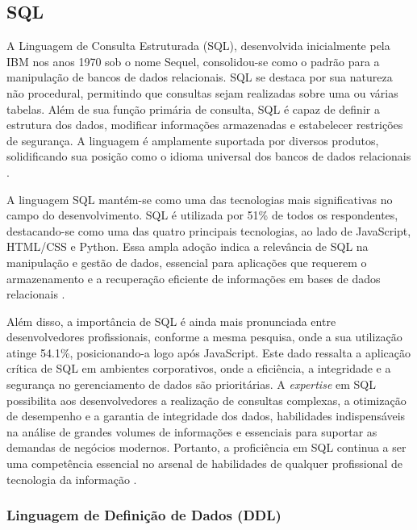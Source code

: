 \subsection{SQL}

A Linguagem de Consulta Estruturada (SQL), desenvolvida inicialmente pela IBM nos anos 1970 sob o nome Sequel, consolidou-se como o padrão para a manipulação de bancos de dados relacionais. SQL se destaca por sua natureza não procedural, permitindo que consultas sejam realizadas sobre uma ou várias tabelas. Além de sua função primária de consulta, SQL é capaz de definir a estrutura dos dados, modificar informações armazenadas e estabelecer restrições de segurança. A linguagem é amplamente suportada por diversos produtos, solidificando sua posição como o idioma universal dos bancos de dados relacionais \cite{silberschatz2011database}.

A linguagem SQL mantém-se como uma das tecnologias mais significativas no campo do desenvolvimento. SQL é utilizada por 51\% de todos os respondentes, destacando-se como uma das quatro principais tecnologias, ao lado de JavaScript, HTML/CSS e Python. Essa ampla adoção indica a relevância de SQL na manipulação e gestão de dados, essencial para aplicações que requerem o armazenamento e a recuperação eficiente de informações em bases de dados relacionais \cite{StackOverflow2024}.

Além disso, a importância de SQL é ainda mais pronunciada entre desenvolvedores profissionais, conforme a mesma pesquisa, onde a sua utilização atinge 54.1\%, posicionando-a logo após JavaScript. Este dado ressalta a aplicação crítica de SQL em ambientes corporativos, onde a eficiência, a integridade e a segurança no gerenciamento de dados são prioritárias. A \textit{expertise} em SQL possibilita aos desenvolvedores a realização de consultas complexas, a otimização de desempenho e a garantia de integridade dos dados, habilidades indispensáveis na análise de grandes volumes de informações e essenciais para suportar as demandas de negócios modernos. Portanto, a proficiência em SQL continua a ser uma competência essencial no arsenal de habilidades de qualquer profissional de tecnologia da informação \cite{StackOverflow2024}.


\subsubsection{Linguagem de Definição de Dados (DDL)}


